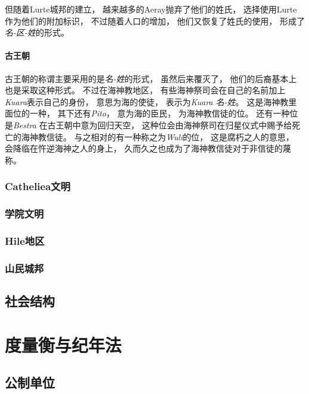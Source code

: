 \documentclass[UTF8,12pt,draft]{ctexbook}
\begin{document}
                    但随着Lurte城邦的建立，
                    越来越多的Aeray抛弃了他们的姓氏，
                    选择使用Lurte作为他们的附加标识，
                    不过随着人口的增加，
                    他们又恢复了姓氏的使用，
                    形成了\emph{名-区-姓}的形式。
                \subsubsection{古王朝}
                    古王朝的称谓主要采用的是\emph{名-姓}的形式，
                    虽然后来覆灭了，
                    他们的后裔基本上也是采取这种形式。
                    不过在海神教地区，
                    有些海神祭司会在自己的名前加上\emph{Kuara}表示自己的身份，
                    意思为海的使徒，
                    表示为\emph{Kuara 名-姓}。
                    这是海神教里面位的一种，
                    其下还有\emph{Pito}，
                    意为海的臣民，
                    为海神教信徒的位。
                    还有一种位是\emph{Bestra}
                    在古王朝中意为回归天空，
                    这种位会由海神祭司在归星仪式中赐予给死亡的海神教信徒。
                    与之相对的有一种称之为\emph{Wuli}的位，
                    这是腐朽之人的意思，
                    会降临在忤逆海神之人的身上，
                    久而久之也成为了海神教信徒对于非信徒的蔑称。
            \subsection{Catheliea文明}
            \subsection{学院文明}
            \subsection{Hile地区}
            \subsection{山民城邦}
        \section{社会结构}
    \chapter{度量衡与纪年法}
        \section{公制单位}
\end{document}
